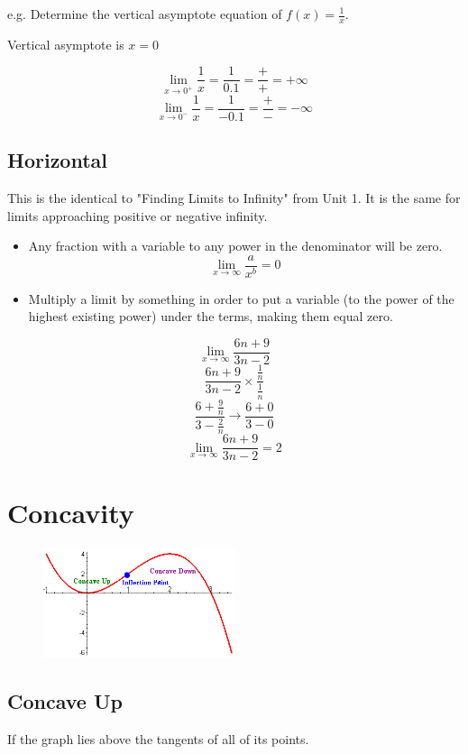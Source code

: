 \documentclass[a4paper,12pt]{article}
\begin{document}
e.g. Determine the vertical asymptote equation of $f(x) = \frac{1}{x}$.

Vertical asymptote is $x = 0$

$$\lim\limits_{x \to 0^+}\frac{1}{x} = \frac{1}{0.1} = \frac{+}{+} = +\infty$$
$$\lim\limits_{x \to 0^-}\frac{1}{x} = \frac{1}{-0.1} = \frac{+}{-} = -\infty$$

\pagebreak

\subsection{Horizontal}
This is the identical to "Finding Limits to Infinity" from Unit 1. It is the same for limits approaching positive or negative infinity.

\begin{itemize}
    \item{Any fraction with a variable to any power in the denominator will be zero. $$\lim\limits_{x\to\infty}{\frac{a}{x^b}} = 0$$}
    \item{Multiply a limit by something in order to put a variable (to the power of the highest existing power) under the terms, making them equal zero.}
\end{itemize}

$$\lim\limits_{x\to\infty}{\frac{6n+9}{3n-2}}$$
$$\frac{6n+9}{3n-2} \times \frac{\frac{1}{n}}{\frac{1}{n}}$$
$$\frac{6+\frac{9}{n}}{3-\frac{2}{n}} \longrightarrow \frac{6+0}{3-0}$$
$$\lim\limits_{x\to\infty}{\frac{6n+9}{3n-2}} = 2$$

\pagebreak

\section{Concavity}
\begin{figure}[H]
    \centering
    \includegraphics[width=0.50\textwidth]{concave}
\end{figure}

\subsection{Concave Up}
If the graph lies above the tangents of all of its points.
\end{document}
